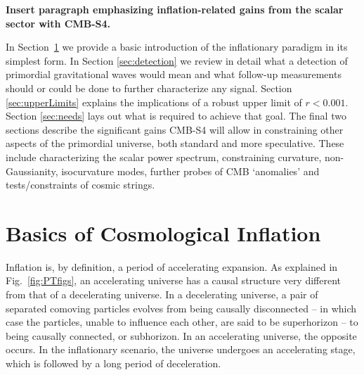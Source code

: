 {\bf Insert paragraph emphasizing inflation-related gains from the scalar sector with CMB-S4.}

In Section~\ref{sec:basics} we provide a basic introduction of the inflationary paradigm in its simplest form. In Section \ref{sec:detection} we review in detail what a detection of primordial gravitational waves would mean and what follow-up measurements should or could be done to further characterize any signal. Section \ref{sec:upperLimits} explains the implications of a robust upper limit of $r<0.001$. Section \ref{sec:needs} lays out what is required to achieve that goal. The final two sections describe the significant gains CMB-S4 will allow in constraining other aspects of the primordial universe, both standard and more speculative. These include characterizing the scalar power spectrum, constraining curvature, non-Gaussianity, isocurvature modes, further probes of CMB `anomalies' and tests/constraints of cosmic strings.
 


\section{Basics of Cosmological Inflation}
\label{sec:basics}

Inflation is, by definition, a period of accelerating expansion. As explained in Fig.~\ref{fig:PTfigs}, an accelerating universe has a causal structure very different from that of a decelerating universe. In a decelerating universe, a pair of separated comoving particles evolves from being causally disconnected -- in which case the particles, unable to influence each other, are said to be superhorizon -- to being causally connected, or subhorizon. In an accelerating universe, the opposite occurs. In the inflationary scenario, the universe undergoes an accelerating stage, which is followed by a long period of deceleration.



